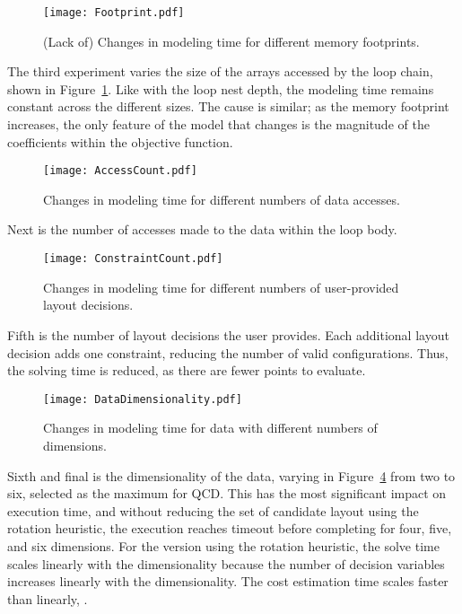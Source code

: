 \begin{figure}
\texttt{[image: Footprint.pdf]}
\caption{(Lack of) Changes in modeling time for different memory footprints.}\label{Footprint}
\end{figure}
The third experiment varies the size of the arrays accessed by the loop chain, shown in Figure~\ref{Footprint}.
Like with the loop nest depth, the modeling time remains constant across the different sizes.
The cause is similar; as the memory footprint increases, the only feature of the model that changes is the magnitude of the coefficients within the objective function.


\begin{figure}
	\texttt{[image: AccessCount.pdf]}
	\caption{Changes in modeling time for different numbers of data accesses.}\label{AccessCount}
\end{figure}
Next is the number of accesses made to the data within the loop body.

\begin{figure}
	\texttt{[image: ConstraintCount.pdf]}
	\caption{Changes in modeling time for different numbers of user-provided layout decisions.}\label{ConstraintCount}
\end{figure}
Fifth is the number of layout decisions the user provides. 
Each additional layout decision adds one constraint, reducing the number of valid configurations. 
Thus, the solving time is reduced, as there are fewer points to evaluate.


\begin{figure}
	\texttt{[image: DataDimensionality.pdf]}
	\caption{Changes in modeling time for data with different numbers of dimensions.}\label{DataDimensionality}
\end{figure}
Sixth and final is the dimensionality of the data, varying in Figure~\ref{DataDimensionality} from two to six, selected as the maximum for QCD.
This has the most significant impact on execution time, and without reducing the set of candidate layout using the rotation heuristic, the execution reaches timeout before completing for four, five, and six dimensions.
For the version using the rotation heuristic, the solve time scales linearly with the dimensionality because the number of decision variables increases linearly with the dimensionality.
The cost estimation time scales faster than linearly, .


